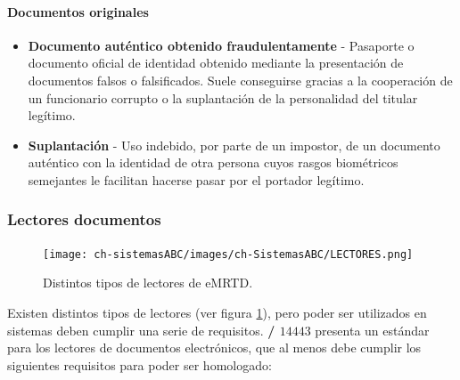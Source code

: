 \paragraph{Documentos originales}
\begin{itemize}
    \item
    \textbf{Documento auténtico obtenido fraudulentamente} - Pasaporte o documento oficial de identidad obtenido mediante la presentación de documentos falsos o falsificados. Suele conseguirse gracias a la cooperación de un funcionario corrupto o la suplantación de la personalidad del titular legítimo.

    \item
    \textbf{Suplantación} - Uso indebido, por parte de un impostor, de un documento auténtico con la identidad de otra persona cuyos rasgos biométricos semejantes le facilitan hacerse pasar por el portador legítimo.
\end{itemize}

\subsubsection{Lectores documentos}\label{subsec:LectorDocumentos}

\begin{figure}
  \centering
  \texttt{[image: ch-sistemasABC/images/ch-SistemasABC/LECTORES.png]}
  \caption{Distintos tipos de lectores de \gls{eMRTD}.}
  \label{fig:lectoresDocumentos}
\end{figure}

Existen distintos tipos de lectores  (ver figura \ref{fig:lectoresDocumentos}), pero poder ser utilizados en sistemas  deben cumplir una serie de requisitos. \textbf{/ $14443$} presenta un estándar para los lectores de documentos electrónicos, que al menos  debe cumplir los siguientes requisitos para poder ser homologado:

